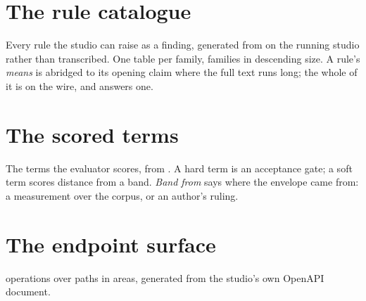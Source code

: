 \appendix

\chapter{The rule catalogue}
\label{app:rules}

Every rule the studio can raise as a finding, generated from
 on the running studio rather than transcribed. One table
per family, families in descending size. A rule's \emph{means} is abridged to its
opening claim where the full text runs long; the whole of it is on the wire, and
 answers one.

{\scriptsize}

\chapter{The scored terms}
\label{app:terms}

The \ScoredTermCount{} terms the evaluator scores, from
. A hard term is an acceptance gate; a soft term
scores distance from a band. \emph{Band from} says where the envelope came from:
a measurement over the corpus, or an author's ruling.

{\scriptsize}

\chapter{The endpoint surface}
\label{app:routes}

\RouteCount{} operations over \RoutePathCount{} paths in \RouteAreaCount{} areas,
generated from the studio's own OpenAPI document.

{\scriptsize}
